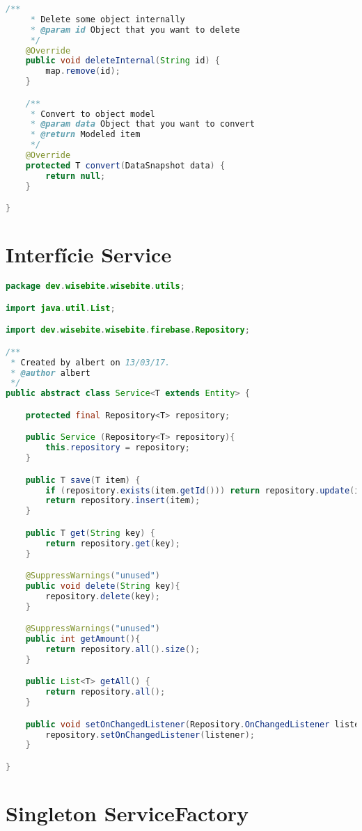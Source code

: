\begin{lstlisting}[language=java,firstnumber=1]
    /**
     * Delete some object internally
     * @param id Object that you want to delete
     */
    @Override
    public void deleteInternal(String id) {
        map.remove(id);
    }

    /**
     * Convert to object model
     * @param data Object that you want to convert
     * @return Modeled item
     */
    @Override
    protected T convert(DataSnapshot data) {
        return null;
    }

}
\end{lstlisting}

\clearpage
\section{Interfície Service}
\label{Service}

\begin{lstlisting}[language=java,firstnumber=1]
package dev.wisebite.wisebite.utils;

import java.util.List;

import dev.wisebite.wisebite.firebase.Repository;

/**
 * Created by albert on 13/03/17.
 * @author albert
 */
public abstract class Service<T extends Entity> {

    protected final Repository<T> repository;

    public Service (Repository<T> repository){
        this.repository = repository;
    }

    public T save(T item) {
        if (repository.exists(item.getId())) return repository.update(item);
        return repository.insert(item);
    }

    public T get(String key) {
        return repository.get(key);
    }

    @SuppressWarnings("unused")
    public void delete(String key){
        repository.delete(key);
    }

    @SuppressWarnings("unused")
    public int getAmount(){
        return repository.all().size();
    }

    public List<T> getAll() {
        return repository.all();
    }

    public void setOnChangedListener(Repository.OnChangedListener listener){
        repository.setOnChangedListener(listener);
    }

}
\end{lstlisting}

\clearpage
\section{Singleton ServiceFactory}
\label{ServiceFactory}

